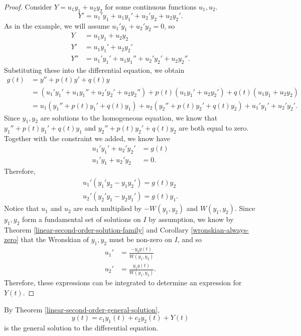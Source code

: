 \begin{proof}
    Consider $Y = u_1y_1 + u_2y_2$ for some continuous functions $u_1, u_2$.
    \[Y' = u_1'y_1 + u_1y_1' + u_2'y_2 + u_2y_2'.\]
    As in the example, we will assume $u_1'y_1 + u_2'y_2 = 0$, so
    \begin{align*}
        Y &= u_1y_1 + u_2y_2 \\
        Y' &= u_1y_1' + u_2y_2' \\
        Y'' &= u_1'y_1' + u_1y_1'' + u_2'y_2' + u_2y_2''.
    \end{align*}
    Substituting these into the differential equation, we obtain
    \begin{align*}
        g(t) &= y'' + p(t)y' + q(t)y \\
        &= \left(u_1'y_1' + u_1y_1'' + u_2'y_2' + u_2y_2''\right) + p(t)\left(u_1y_1' + u_2y_2'\right) + q(t)\left(u_1y_1 + u_2y_2\right) \\
        &= u_1(y_1'' + p(t)y_1' + q(t)y_1) + u_2(y_2'' + p(t)y_2' + q(t)y_2) + u_1'y_1' + u_2'y_2'.
    \end{align*}
    Since $y_1, y_2$ are solutions to the homogeneous equation, we know that $y_1'' + p(t)y_1' + q(t)y_1$ and $y_2'' + p(t)y_2' + q(t)y_2$ are both equal to zero.
    Together with the constraint we added, we know have
    \begin{align*}
        u_1'y_1' + u_2'y_2' &= g(t) \\
        u_1'y_1 + u_2'y_2 &= 0.
    \end{align*}
    Therefore,
    \begin{align*}
        u_1'(y_1'y_2 - y_1y_2') = g(t)y_2 \\
        u_2'(y_2'y_1 - y_2y_1') = g(t)y_1.
    \end{align*}
    Notice that $u_1$ and $u_2$ are each multiplied by $-W(y_1, y_2)$ and $W(y_1, y_2)$. Since $y_1, y_2$ form a fundamental set of solutions on $I$ by assumption, we know by Theorem \ref{linear-second-order-solution-family} and Corollary \ref{wronskian-always-zero} that the Wronskian of $y_1, y_2$ must be non-zero on $I$, and so
    \begin{align*}
        u_1' &= \frac{-y_2g(t)}{W(y_1, y_2)} \\
        u_2' &= \frac{y_1g(t)}{W(y_1, y_2)}.
    \end{align*}
    Therefore, these expressions can be integrated to determine an expression for $Y(t)$.
\end{proof}

\begin{cor}
    By Theorem \ref{linear-second-order-general-solution},
    \[y(t) = c_1y_1(t) + c_2y_2(t) + Y(t)\]
    is the general solution to the differential equation.
\end{cor}

